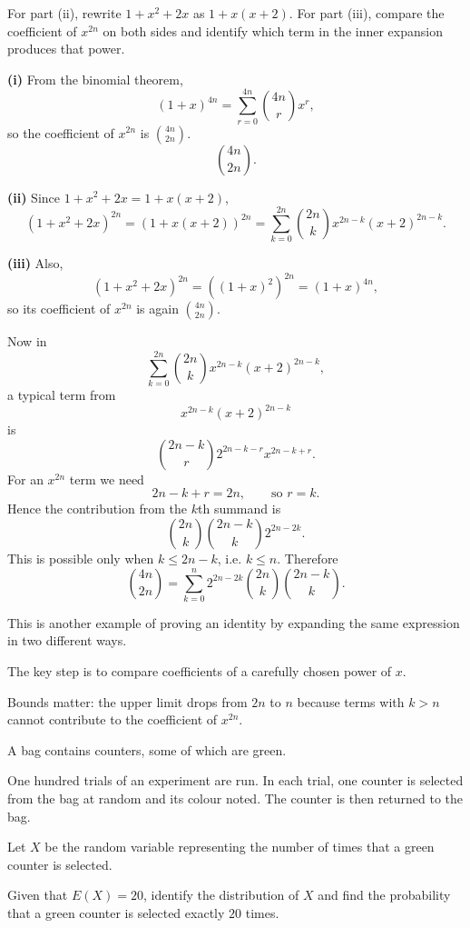 \begin{hint}
For part (ii), rewrite $1+x^2+2x$ as $1+x(x+2)$. For part (iii), compare the coefficient of $x^{2n}$ on both sides and identify which term in the inner expansion produces that power.
\end{hint}

\begin{solution}
\textbf{(i)} From the binomial theorem,
\[
\left(1+x\right)^{4n}=\sum_{r=0}^{4n}\binom{4n}{r}x^r,
\]
so the coefficient of $x^{2n}$ is $\binom{4n}{2n}$.
\[
\boxed{\binom{4n}{2n}}.
\]

\textbf{(ii)} Since $1+x^2+2x=1+x(x+2)$,
\[
\left(1+x^2+2x\right)^{2n}
=\left(1+x(x+2)\right)^{2n}
=\sum_{k=0}^{2n}\binom{2n}{k}x^{2n-k}(x+2)^{2n-k}.
\]

\textbf{(iii)} Also,
\[
(1+x^2+2x)^{2n}=((1+x)^2)^{2n}=(1+x)^{4n},
\]
so its coefficient of $x^{2n}$ is again $\binom{4n}{2n}$.

Now in
\[
\sum_{k=0}^{2n}\binom{2n}{k}x^{2n-k}(x+2)^{2n-k},
\]
a typical term from
\[
x^{2n-k}(x+2)^{2n-k}
\]
is
\[
\binom{2n-k}{r}2^{2n-k-r}x^{2n-k+r}.
\]
For an $x^{2n}$ term we need
\[
2n-k+r=2n,
\qquad \text{so } r=k.
\]
Hence the contribution from the $k$th summand is
\[
\binom{2n}{k}\binom{2n-k}{k}2^{2n-2k}.
\]
This is possible only when $k\le 2n-k$, i.e. $k\le n$. Therefore
\[
\binom{4n}{2n}
=\sum_{k=0}^{n}2^{2n-2k}\binom{2n}{k}\binom{2n-k}{k}.
\]
\end{solution}

\begin{takeaways}
\item This is another example of proving an identity by expanding the same expression in two different ways.
\item The key step is to compare coefficients of a carefully chosen power of $x$.
\item Bounds matter: the upper limit drops from $2n$ to $n$ because terms with $k>n$ cannot contribute to the coefficient of $x^{2n}$.
\end{takeaways}

\begin{problem}
A bag contains counters, some of which are green.

One hundred trials of an experiment are run. In each trial, one counter is selected from the bag at random and its colour noted. The counter is then returned to the bag.

Let $X$ be the random variable representing the number of times that a green counter is selected.

Given that $E(X)=20$, identify the distribution of $X$ and find the probability that a green counter is selected exactly $20$ times.
\end{problem}

